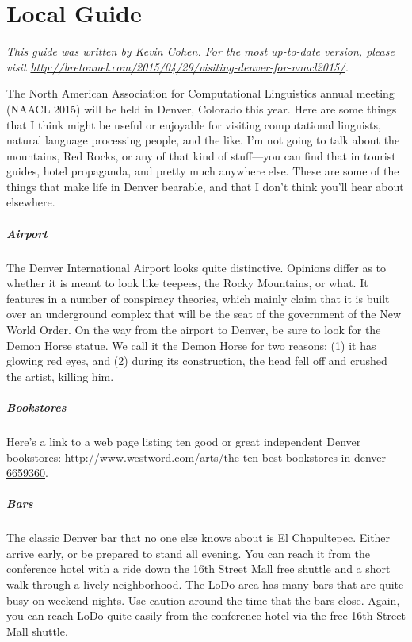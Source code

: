 \chapter{Local Guide}

\emph{This guide was written by Kevin Cohen. For the most up-to-date
  version, please visit
  \url{http://bretonnel.com/2015/04/29/visiting-denver-for-naacl2015/}.}

The North American Association for Computational Linguistics annual
meeting (NAACL 2015) will be held in Denver, Colorado this year. Here
are some things that I think might be useful or enjoyable for visiting
computational linguists, natural language processing people, and the
like. I'm not going to talk about the mountains, Red Rocks, or any of
that kind of stuff---you can find that in tourist guides, hotel
propaganda, and pretty much anywhere else.  These are some of the
things that make life in Denver bearable, and that I don't think
you'll hear about elsewhere.

\paragraph{Airport}

The Denver International Airport looks quite distinctive. Opinions
differ as to whether it is meant to look like teepees, the Rocky
Mountains, or what. It features in a number of conspiracy theories,
which mainly claim that it is built over an underground complex that
will be the seat of the government of the New World Order. On the way
from the airport to Denver, be sure to look for the Demon Horse
statue. We call it the Demon Horse for two reasons: (1) it has glowing
red eyes, and (2) during its construction, the head fell off and
crushed the artist, killing him.

\paragraph{Bookstores}

Here's a link to a web page listing ten good or great independent
Denver bookstores:
\url{http://www.westword.com/arts/the-ten-best-bookstores-in-denver-6659360}. 

\paragraph{Bars}

The classic Denver bar that no one else knows about is El Chapultepec.
Either arrive early, or be prepared to stand all evening. You can
reach it from the conference hotel with a ride down the 16th Street
Mall free shuttle and a short walk through a lively neighborhood. The
LoDo area has many bars that are quite busy on weekend nights. Use
caution around the time that the bars close. Again, you can reach
LoDo quite easily from the conference hotel via the free 16th Street
Mall shuttle.

